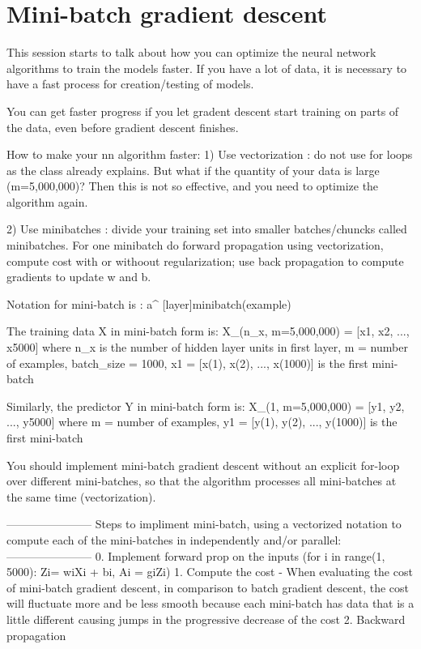 \documentclass[11pt, onecolumn]{article}
\begin{document}
\section{Mini-batch gradient descent}

This session starts to talk about how you can optimize the neural network algorithms to train the models faster.  If you have a lot of data, it is necessary to have a fast process for creation/testing of models.

You can get faster progress if you let gradent descent start training on parts of the data, even before gradient descent finishes.

How to make your nn algorithm faster:
1) Use vectorization : do not use for loops as the class already explains.  But what if the quantity of your data is large (m=5,000,000)?  Then this is not so effective, and you need to optimize the algorithm again.

2) Use minibatches : divide your training set into smaller batches/chuncks called minibatches. For one minibatch do forward propagation using vectorization, compute cost with or withoout regularization; use back propagation to compute gradients to update w and b.

Notation for mini-batch is : a^{ [layer]{minibatch}(example) }

The training data X in mini-batch form is: 
X_(n_x, m=5,000,000) = [x{1}, x{2}, ..., x{5000}] where 
n_x is the number of hidden layer units in first layer, 
m = number of examples, 
batch_size = 1000,
x{1} = [x(1), x(2), ..., x(1000)] is the first mini-batch

Similarly, the predictor Y in mini-batch form is:
X_(1, m=5,000,000) = [y{1}, y{2}, ..., y{5000}] where 
m = number of examples, 
y{1} = [y(1), y(2), ..., y(1000)] is the first mini-batch


You should implement mini-batch gradient descent without an explicit for-loop over different mini-batches, so that the algorithm processes all mini-batches at the same time (vectorization). 

-----------------------
Steps to impliment mini-batch, using a vectorized notation to compute each of the mini-batches in independently and/or parallel:
-----------------------
0. Implement forward prop on the inputs (for i in range(1, 5000): Z{i}= w{i}X{i} + b{i}, A{i} = g{i}Z{i})
1. Compute the cost
	- When evaluating the cost of mini-batch gradient descent, in comparison to batch gradient descent, the cost will fluctuate more and be less smooth because each mini-batch has data that is a little different causing jumps in the progressive decrease of the cost 
2. Backward propagation
\end{document}
